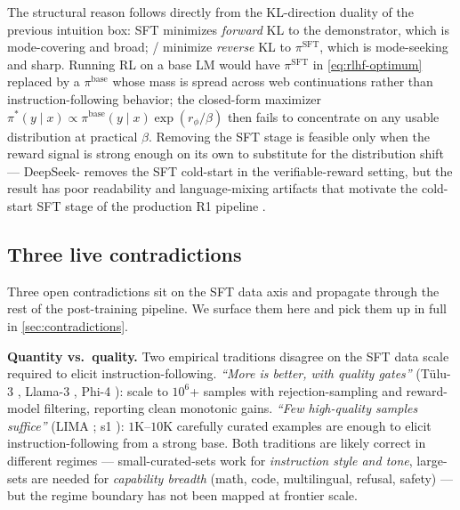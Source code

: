 The structural reason follows directly from the KL-direction duality
of the previous intuition box: SFT minimizes \emph{forward} KL to the
demonstrator, which is mode-covering and broad;  /  minimize
\emph{reverse} KL to $\pi^{\mathrm{SFT}}$, which is mode-seeking and
sharp. Running RL on a base LM would have $\pi^{\mathrm{SFT}}$ in
\cref{eq:rlhf-optimum} replaced by a $\pi^{\mathrm{base}}$ whose mass
is spread across web continuations rather than instruction-following
behavior; the closed-form maximizer
$\pi^*(y \mid x) \propto \pi^{\mathrm{base}}(y \mid x) \exp(r_\phi /
\beta)$ then fails to concentrate on any usable distribution at
practical $\beta$. Removing the SFT stage is feasible only when the
reward signal is strong enough on its own to substitute for the
distribution shift — DeepSeek- \citep[\S 2]{deepseek-r1}
removes the SFT cold-start in the verifiable-reward setting, but the
result has poor readability and language-mixing artifacts that
motivate the cold-start SFT stage of the production R1 pipeline
\citep[\S 3]{deepseek-r1}.

\subsection{Three live contradictions}
\label{sec:sft-contradictions}

Three open contradictions sit on the SFT data axis and propagate
through the rest of the post-training pipeline. We surface them here
and pick them up in full in \cref{sec:contradictions}.

\begin{contradiction}
\textbf{Quantity vs.\ quality.} Two empirical traditions disagree on
the SFT data scale required to elicit instruction-following.
\emph{``More is better, with quality gates''} (T\"ulu-3
\citep{tulu3}, Llama-3 \citep{meta-llama3}, Phi-4 \citep{phi4}):
scale to $10^6$+ samples with rejection-sampling and reward-model
filtering, reporting clean monotonic gains.
\emph{``Few high-quality samples suffice''}
(LIMA ; s1
\citep{s1-2025}): $1$K--$10$K carefully curated examples are enough
to elicit instruction-following from a strong base. Both traditions
are likely correct in different regimes — small-curated-sets work for
\emph{instruction style and tone}, large-sets are needed for
\emph{capability breadth} (math, code, multilingual, refusal,
safety) — but the regime boundary has not been mapped at frontier
scale.
\end{contradiction}

